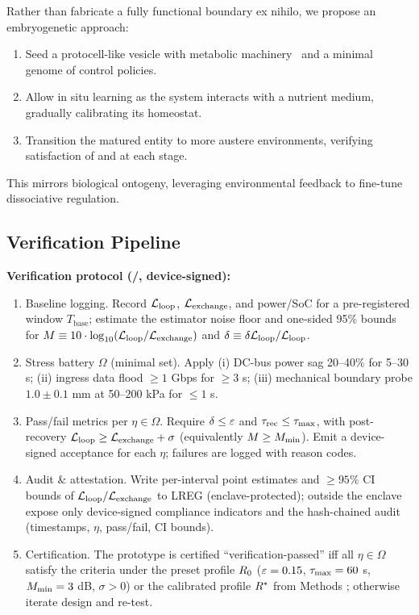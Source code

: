 \documentclass[11pt]{article}
\begin{document}
Rather than fabricate a fully functional boundary ex nihilo, we propose an embryogenetic approach:

\begin{enumerate}
\item Seed a protocell-like vesicle with metabolic machinery~\cite{ruizmirazo2008basic} and a minimal genome of control policies.
\item Allow in situ learning as the system interacts with a nutrient medium, gradually calibrating its homeostat.
\item Transition the matured entity to more austere environments, verifying satisfaction of \NC and \SC at each stage.
\end{enumerate}

This mirrors biological ontogeny, leveraging environmental feedback to fine-tune dissociative regulation.

\subsection{Verification Pipeline}
\label{sec:verification_pipeline}

\textbf{Verification protocol (\NC/\SC, device-signed):}
\begin{enumerate}
\item Baseline logging. Record $\mathcal{L}_{\text{loop}}$, $\mathcal{L}_{\text{exchange}}$, and power/SoC for a pre-registered window $T_{\text{base}}$; estimate the estimator noise floor and one-sided 95\% bounds for $M \equiv 10\cdot\log_{10}(\mathcal{L}_{\text{loop}}/\mathcal{L}_{\text{exchange}})$ and $\delta \equiv \delta\mathcal{L}_{\text{loop}}/\mathcal{L}_{\text{loop}}$.
\item Stress battery $\Omega$ (minimal set). Apply (i) DC-bus power sag 20--40\% for 5--30 s; (ii) ingress data flood $\geq 1$ Gbps for $\geq 3$ s; (iii) mechanical boundary probe $1.0 \pm 0.1$ mm at 50--200 kPa for $\leq 1$ s.
\item Pass/fail metrics per $\eta \in \Omega$. Require $\delta \leq \varepsilon$ and $\tau_{\text{rec}} \leq \tau_{\max}$, with post-recovery $\mathcal{L}_{\text{loop}} \geq \mathcal{L}_{\text{exchange}} + \sigma$ (equivalently $M \geq M_{\min}$). Emit a device-signed acceptance for each $\eta$; failures are logged with reason codes.
\item Audit \& attestation. Write per-interval point estimates and $\geq 95\%$ CI bounds of $\mathcal{L}_{\text{loop}}/\mathcal{L}_{\text{exchange}}$ to LREG (enclave-protected); outside the enclave expose only device-signed compliance indicators and the hash-chained audit (timestamps, $\eta$, pass/fail, CI bounds).
\item Certification. The prototype is certified ``verification-passed'' iff all $\eta \in \Omega$ satisfy the criteria under the preset profile $R_0$ ($\varepsilon=0.15$, $\tau_{\max}=60$ s, $M_{\min}=3$ dB, $\sigma>0$) or the calibrated profile $R^*$ from Methods ; otherwise iterate design and re-test.
\end{enumerate}
\end{document}
